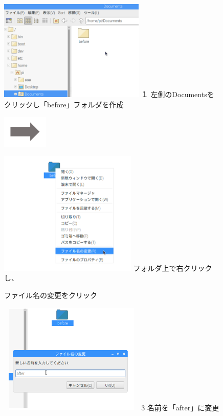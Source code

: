 \documentclass[a4paper,12pt]{jarticle}
\begin{document}
\begin{figure}[ht]
  \begin{minipage}{6.656cm}
    \includegraphics[width=6.96cm,height=4.824cm]{textbook-img058.png}
    \flushleft
    １
    左側のDocumentsをクリックし「before」フォルダを作成
  \end{minipage}
  \includegraphics[width=2.168cm,height=1.542cm]{textbook-img052.png}
  \begin{minipage}{5.751cm}
    \includegraphics[width=6.555cm,height=5.941cm]{textbook-img057.png}
     フォルダ上で右クリックし、

    ファイル名の変更をクリック
  \end{minipage}

  \begin{minipage}{6.973cm}
    \includegraphics[width=6.973cm,height=5.327cm]{textbook-img055.png}
    3 名前を「after」に変更


\end{minipage}
\end{figure}
\end{document}
